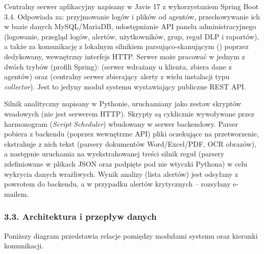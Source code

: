 Centralny serwer aplikacyjny napisany w Javie 17 z wykorzystaniem Spring Boot 3.4. Odpowiada za:
przyjmowanie logów i plików od agentów, przechowywanie ich w bazie danych MySQL/MariaDB,
udostępnianie API panelu administracyjnego (logowanie, przegląd logów, alertów, użytkowników,
grup, reguł DLP i raportów), a także za komunikację z lokalnym silnikiem parsująco-skanującym
() poprzez dedykowany, wewnętrzny interfejs HTTP. Serwer może pracować w jednym
z dwóch trybów (profili Spring): \textbf{} (serwer wdrażany u klienta, zbiera dane
z agentów) oraz \textbf{} (centralny serwer zbierający alerty z wielu instalacji
typu \emph{collector}). Jest to jedyny moduł systemu wystawiający publiczne REST API.

Silnik analityczny napisany w Pythonie, uruchamiany jako zestaw skryptów wsadowych (nie jest
serwerem HTTP). Skrypty są cyklicznie wywoływane przez harmonogram (\emph{Script Scheduler})
wbudowany w serwer backendowy. Parser pobiera z backendu (poprzez wewnętrzne API) pliki oczekujące
na przetworzenie, ekstrahuje z nich tekst (parsery dokumentów Word/Excel/PDF, OCR obrazów),
a następnie uruchamia na wyekstrahowanej treści silnik reguł (parsery zdefiniowane w plikach JSON
oraz podpięte pod nie wtyczki Pythona) w celu wykrycia danych wrażliwych. Wynik analizy (lista
alertów) jest odsyłany z powrotem do backendu, a w przypadku alertów krytycznych -- rozsyłany
e-mailem.

\subsubsection*{3.3. Architektura i przepływ danych}

Poniższy diagram przedstawia relacje pomiędzy modułami systemu oraz kierunki komunikacji.

